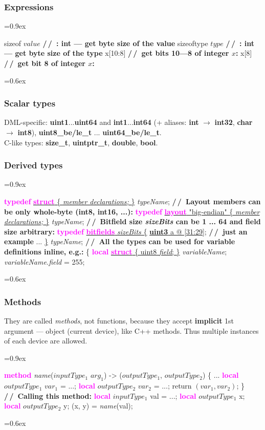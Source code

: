 \documentclass[8pt]{extarticle}
\newcommand{\vshort}[1]{%
\vspace{-0.6em}%
#1%
\vspace{0.0em}}
\newcommand{\vshort}[1]{%
#1%
}
\newenvironment{code}[1][]{%
\begin{prebox}[#1]\obeylines%
\fontdimen2\font=0.9ex%
}{%
\end{prebox}%
\fontdimen2\font=0.6ex%
}
\newcommand{\ind}{\hphantom{~~~}}
\newcommand{\kw}[1]{\textcolor{magenta}{\textbf{#1}}}
\newcommand{\ty}[1]{\textcolor{myOrange}{\textbf{#1}}}
\newcommand{\cmtcommon}[1]{\textcolor{Sepia}{\textbf{#1}}}
\newcommand{\cmtd}[1]{\cmtcommon{/\,/\ #1}}
\newcommand{\p}[1]{\textit{\large#1}}
\begin{document}
\begin{multicols*}{3}
    \subsubsection{Expressions}
    \begin{code}
        sizeof $value$  \cmtd{: int — get byte size of the value}
        sizeoftype \ty{$type$}  \cmtd{: int — get byte size of the type}
        x[10:8]  \cmtd{get bits 10—8 of integer $x$:}
        x[8]  \cmtd{get bit 8 of integer $x$:}
    \end{code}

    \subsubsection{Scalar types}
    DML-specific: \ty{uint1}...\ty{uint64} and \ty{int1}...\ty{int64} (+ aliases:
    \ty{int} $→$ \ty{int32}, \ty{char} $→$ \ty{int8}),
    \ty{uint8_be/le_t} ... \ty{uint64_be/le_t}.
    \\
    C-like types: \ty{size_t}, \ty{uintptr_t}, \ty{double}, \ty{bool}.

    \subsubsection{Derived types}
    \begin{code}
        \kw{typedef} \underline{\kw{struct} \{ \p{member declarations;} \}} \p{typeName};
        \cmtd{Layout members can be only whole-byte (\ty{int8}, \ty{int16}, ...):}
        \kw{typedef} \underline{\kw{layout} "big-endian" \{ \p{member declarations;} \}} \p{typeName};
        \cmtd{Bitfield size \p{sizeBits} can be 1 ... 64 and field size arbitrary:}
        \kw{typedef} \underline{\kw{bitfields} \p{sizeBits} \{}
            \ind \underline{\ty{uint3}  a @ [31:29];} \ind \cmtd{just an example}
            \ind ...
        \underline{\}} \p{typeName};
        \cmtd{All the types can be used for variable definitions inline, e.g.:}
        \{
            \ind \kw{local} \underline{\kw{struct} \{ uint8 \p{field}; \}} \p{variableName};
            \ind \p{variableName.field} = 255;
    \end{code}
    

    \subsubsection{Methods}
    They are called \textit{methods}, not functions, because
    they accept \textbf{implicit} 1st argument — object (current
    device), like C++ methods. Thus multiple instances of each device are allowed.
    \begin{code}
        \kw{method} \p{name}(\ty{$inputType_1$} $arg_1$) -> (\ty{$outputType_1$}, \ty{$outputType_2$}) \{
            \vshort{\ind ...}
            \ind \kw{local} \ty{$outputType_1$} $var_1$ = ...; \kw{local} \ty{$outputType_2$} $var_2$ = ...;
            \ind return $(var_1, var_2)$;
        \}
        \cmtd{Calling this method:}
        \kw{local} \ty{$inputType_1$} val = ...;
        \kw{local} \ty{$outputType_1$} x; \kw{local} \ty{$outputType_2$} y;
        (x, y) = \p{name}(val);
    \end{code}


\end{multicols*}
\end{document}
